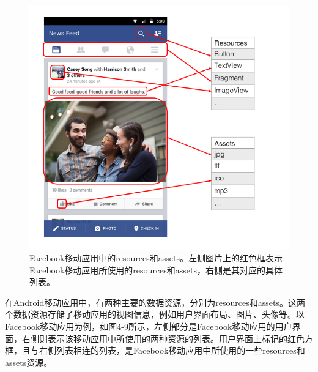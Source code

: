 \begin{figure}
	\centering
	\includegraphics[width=5in]{figures/screenshot}
	\caption{Facebook移动应用中的resources和assets。左侧图片上的红色框表示Facebook移动应用所使用的resources和assets，右侧是其对应的具体列表。}
\end{figure}

在Android移动应用中，有两种主要的数据资源，分别为resources和assets。这两个数据资源存储了移动应用的视图信息，例如用户界面布局、图片、头像等。以Facebook移动应用为例，如图4-9所示，左侧部分是Facebook移动应用的用户界面，右侧则表示该移动应用中所使用的两种资源的列表。用户界面上标记的红色方框，且与右侧列表相连的列表，是Facebook移动应用中所使用的一些resources和assets资源。

